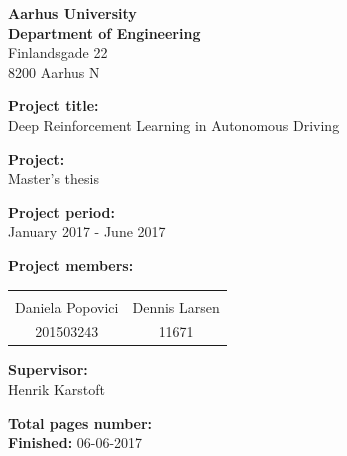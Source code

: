 \begin{minipage}[t]{1\textwidth}
	
	{\small 
		\flushleft
		\textbf{Aarhus University}\\
		\textbf{Department of Engineering}  \\
		Finlandsgade 22 \\
		8200 Aarhus N \\
	}
	
	\vspace*{1cm}
	
	\textbf{Project title:} \\[5pt]\bigskip\hspace{2ex}
	Deep Reinforcement Learning in Autonomous Driving
	
	\textbf{Project:} \\[5pt]\bigskip\hspace{2ex}
	Master's thesis
	
	\textbf{Project period:} \\[5pt]\bigskip\hspace{2ex}
	January 2017 - June 2017
	
	\textbf{Project members:} \\[5pt]\hspace*{2ex}
	\begin{table}[H]
		\begin{tabular}{c c}
			\underline{\phantom{mmmmmmmmmmmmmmmm}} & \underline{\phantom{mmmmmmmmmmmmmmmm}}  
			\\
			Daniela Popovici		& Dennis Larsen	
			\\
			201503243				& 11671												
		\end{tabular}
	\end{table}
	
	\textbf{Supervisor:} \\[5pt]\hspace*{2ex}
	Henrik Karstoft \\\hspace*{2ex}
	
	\textbf{Total pages number:} \pageref{LastPage} \\
	\textbf{Finished:} 06-06-2017
	\hfill
	\vfill
\end{minipage}

